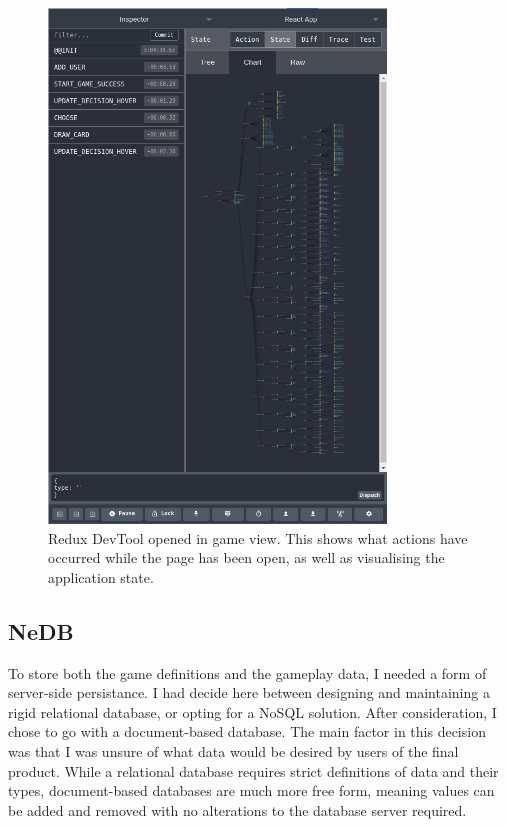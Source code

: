 \begin{figure}[!h]
	\centering
	\includegraphics[width=0.8\textwidth]{./images/impl/redux_view.png}
	\caption{Redux DevTool\cite{ReduxDev} opened in game view. This shows what actions have occurred while the page has been open, as well as visualising the application state.}
	\label{fig:redux_view}
\end{figure}

\subsection{NeDB}
To store both the game definitions and the gameplay data, I needed a form of server-side persistance. I had  decide here between designing and maintaining a rigid relational database, or opting for a NoSQL\cite{NoSQL} solution. After consideration, I chose to go with a document-based database. The main factor in this decision was that I was unsure of what data would be desired by users of the final product. While a relational database requires strict definitions of data and their types, document-based databases are much more free form, meaning values can be added and removed with no alterations to the database server required.

